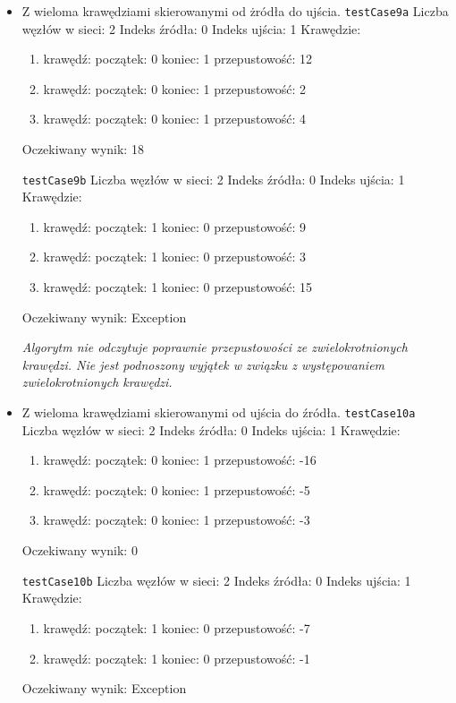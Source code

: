 \begin{itemize}[nosep]
    \item Z wieloma krawędziami skierowanymi od żródła do ujścia.
    \texttt{testCase9a}
    Liczba węzłów w sieci: 2
    Indeks źródła: 0
    Indeks ujścia: 1
    Krawędzie:
    \begin{enumerate}[nosep]
        \item krawędź:
        początek: 0
        koniec: 1
        przepustowość: 12
        \item krawędź:
        początek: 0
        koniec: 1
        przepustowość: 2
        \item krawędź:
        początek: 0
        koniec: 1
        przepustowość: 4
    \end{enumerate}
    Oczekiwany wynik: 18

    \texttt{testCase9b}
    Liczba węzłów w sieci: 2
    Indeks źródła: 0
    Indeks ujścia: 1
    Krawędzie:
    \begin{enumerate}[nosep]
        \item krawędź:
        początek: 1
        koniec: 0
        przepustowość: 9
        \item krawędź:
        początek: 1
        koniec: 0
        przepustowość: 3
        \item krawędź:
        początek: 1
        koniec: 0
        przepustowość: 15
    \end{enumerate}
    Oczekiwany wynik: Exception

    \emph{Algorytm nie odczytuje
    poprawnie przepustowości ze zwielokrotnionych krawędzi. Nie jest
    podnoszony wyjątek w związku z występowaniem zwielokrotnionych krawędzi.}

    \item Z wieloma krawędziami skierowanymi od ujścia do źródła.
    \texttt{testCase10a}
    Liczba węzłów w sieci: 2
    Indeks źródła: 0
    Indeks ujścia: 1
    Krawędzie:
    \begin{enumerate}[nosep]
        \item krawędź:
        początek: 0
        koniec: 1
        przepustowość: -16
        \item krawędź:
        początek: 0
        koniec: 1
        przepustowość: -5
        \item krawędź:
        początek: 0
        koniec: 1
        przepustowość: -3
    \end{enumerate}
    Oczekiwany wynik: 0

    \texttt{testCase10b}
    Liczba węzłów w sieci: 2
    Indeks źródła: 0
    Indeks ujścia: 1
    Krawędzie:
    \begin{enumerate}[nosep]
        \item krawędź:
        początek: 1
        koniec: 0
        przepustowość: -7
        \item krawędź:
        początek: 1
        koniec: 0
        przepustowość: -1
    \end{enumerate}
    Oczekiwany wynik: Exception


\end{itemize}
